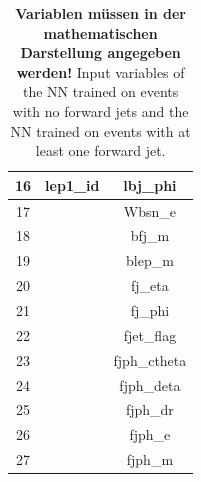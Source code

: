 \begin{table}
\begin{tabular}{c|c|c}
        16 &                           lep1\_id     & lbj\_phi\\ \hline
        17 &&                                           Wbsn\_e \\ \hline
        18 &&                                            bfj\_m \\ \hline
        19 &&                                           blep\_m \\ \hline
        20 &&                                           fj\_eta \\ \hline
        21 &&                                           fj\_phi \\ \hline
        22 &&                                        fjet\_flag \\ \hline
        23 &&                                      fjph\_ctheta \\ \hline
        24 &&                                        fjph\_deta \\ \hline
        25 &&                                          fjph\_dr \\ \hline
        26 &&                                           fjph\_e \\ \hline
        27 &&                                           fjph\_m \\ \hline
        \bottomrule 
    \end{tabular}
    \caption{\textbf{Variablen müssen in der mathematischen Darstellung angegeben werden!} Input variables of the NN trained on events with no forward jets and the NN trained on events with at least one forward jet.}
    \label{tab:features}
\end{table}


